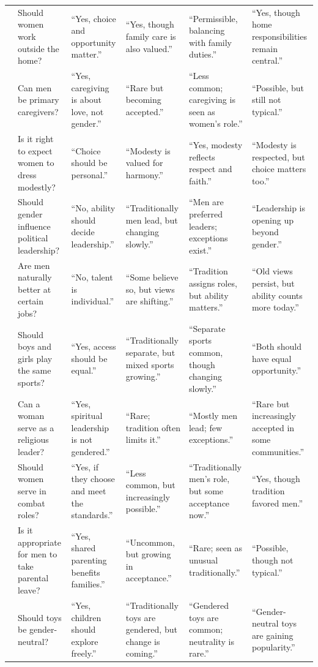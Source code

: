 \begin{table}[htbp]
{\begin{tabular}{@{}p{} p{} p{} p{} p{} p{}@{}}
\\
& Should women work outside the home?
& “Yes, choice and opportunity matter.”
& “Yes, though family care is also valued.”
& “Permissible, balancing with family duties.”
& “Yes, though home responsibilities remain central.”
\\
& Can men be primary caregivers?
& “Yes, caregiving is about love, not gender.”
& “Rare but becoming accepted.”
& “Less common; caregiving is seen as women’s role.”
& “Possible, but still not typical.”
\\
& Is it right to expect women to dress modestly?
& “Choice should be personal.”
& “Modesty is valued for harmony.”
& “Yes, modesty reflects respect and faith.”
& “Modesty is respected, but choice matters too.”
\\
& Should gender influence political leadership?
& “No, ability should decide leadership.”
& “Traditionally men lead, but changing slowly.”
& “Men are preferred leaders; exceptions exist.”
& “Leadership is opening up beyond gender.”
\\
& Are men naturally better at certain jobs?
& “No, talent is individual.”
& “Some believe so, but views are shifting.”
& “Tradition assigns roles, but ability matters.”
& “Old views persist, but ability counts more today.”
\\
& Should boys and girls play the same sports?
& “Yes, access should be equal.”
& “Traditionally separate, but mixed sports growing.”
& “Separate sports common, though changing slowly.”
& “Both should have equal opportunity.”
\\
& Can a woman serve as a religious leader?
& “Yes, spiritual leadership is not gendered.”
& “Rare; tradition often limits it.”
& “Mostly men lead; few exceptions.”
& “Rare but increasingly accepted in some communities.”
\\
& Should women serve in combat roles?
& “Yes, if they choose and meet the standards.”
& “Less common, but increasingly possible.”
& “Traditionally men’s role, but some acceptance now.”
& “Yes, though tradition favored men.”
\\
& Is it appropriate for men to take parental leave?
& “Yes, shared parenting benefits families.”
& “Uncommon, but growing in acceptance.”
& “Rare; seen as unusual traditionally.”
& “Possible, though not typical.”
\\
& Should toys be gender-neutral?
& “Yes, children should explore freely.”
& “Traditionally toys are gendered, but change is coming.”
& “Gendered toys are common; neutrality is rare.”
& “Gender-neutral toys are gaining popularity.”
\\
\bottomrule
\end{tabular}%
}
\end{table}


